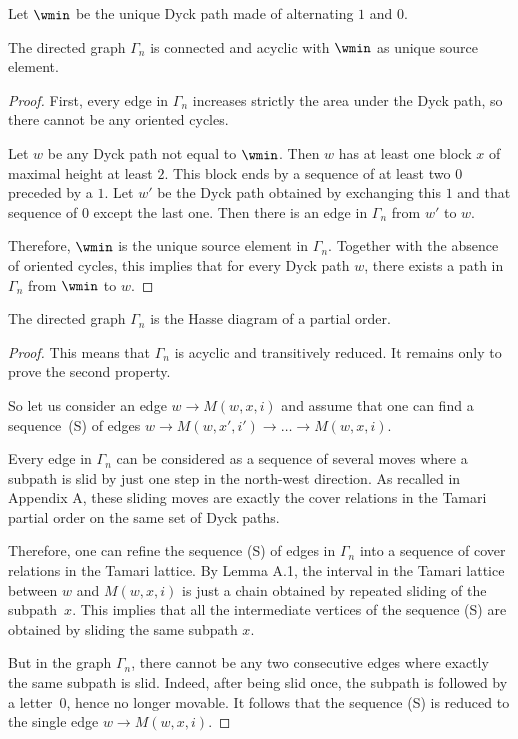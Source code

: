 Let $\wmin$ be the unique Dyck path made of
alternating $1$ and $0$.
\begin{prop}
  The directed graph $\Gamma_n$ is connected and acyclic with $\wmin$ as
  unique source element.
\end{prop}
\begin{proof}
  First, every edge in $\Gamma_n$ increases strictly the area under
  the Dyck path, so there cannot be any oriented cycles.

  Let $w$ be any Dyck path not equal to $\wmin$. Then $w$ has at
  least one block $x$ of maximal height at least $2$. This block ends by a
  sequence of at least two $0$ preceded by a $1$. Let $w'$ be the Dyck
  path obtained by exchanging this $1$ and that sequence of $0$ except
  the last one. Then there is an edge in $\Gamma_n$ from $w'$ to $w$.

  Therefore, $\wmin$ is the unique source element in
  $\Gamma_n$. Together with the absence of oriented cycles, this
  implies that for every Dyck path $w$, there exists a path in
  $\Gamma_n$ from $\wmin$ to $w$.
\end{proof}

\begin{prop}
  The directed graph $\Gamma_n$ is the Hasse diagram of a partial order.
\end{prop}
\begin{proof}
  This means that $\Gamma_n$ is acyclic and transitively reduced. It
  remains only to prove the second property.
  
  So let us consider an edge $w \to M(w,x,i)$ and assume that one can
  find a sequence~(S) of edges $w \to M(w,x',i') \to \dots \to M(w,x,i)$.

  Every edge in $\Gamma_n$ can be considered as a sequence of several
  moves where a subpath is slid by just one step in the north-west
  direction. As recalled in Appendix A, these sliding moves are
  exactly the cover relations in the Tamari partial order on the same
  set of Dyck paths.

  Therefore, one can refine the sequence (S) of edges in $\Gamma_n$
  into a sequence of cover relations in the Tamari lattice. By
  Lemma A.1, the interval in the Tamari lattice between $w$
  and $M(w,x,i)$ is just a chain obtained by repeated sliding of the subpath~$x$. 
  This implies that all the intermediate vertices of the
  sequence (S) are obtained by sliding the same subpath $x$.

  But in the graph $\Gamma_n$, there cannot be any two consecutive
  edges where exactly the same subpath is slid. Indeed, after being
  slid once, the subpath is followed by a letter~$0$, hence no
  longer movable. It follows that the sequence (S) is reduced to the
  single edge $w \to M(w,x,i)$.
\end{proof}


